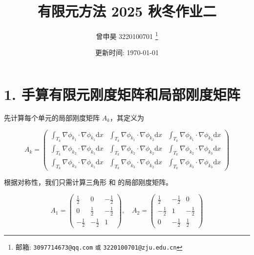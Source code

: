 \documentclass[a4paper]{article}
\begin{document}
\title{有限元方法 2025 秋冬作业二}

\author{曾申昊 3220100701
  \thanks{邮箱: \texttt{3097714673@qq.com}
                            \texttt{或} \texttt{3220100701@zju.edu.cn}}}


\date{更新时间: \today}

\maketitle


\section*{1. 手算有限元刚度矩阵和局部刚度矩阵}

先计算每个单元的局部刚度矩阵 $A_k$，其定义为

\begin{equation}
    A_k =
    \begin{pmatrix}
        \int_{T_k}\nabla \phi_{k_1} \cdot \nabla \phi_{k_1} \text{d}x &
        \int_{T_k}\nabla \phi_{k_1} \cdot \nabla \phi_{k_2} \text{d}x &
        \int_{T_k}\nabla \phi_{k_1} \cdot \nabla \phi_{k_3} \text{d}x\\
        \int_{T_k}\nabla \phi_{k_2} \cdot \nabla \phi_{k_1} \text{d}x &
        \int_{T_k}\nabla \phi_{k_2} \cdot \nabla \phi_{k_2} \text{d}x &
        \int_{T_k}\nabla \phi_{k_2} \cdot \nabla \phi_{k_3} \text{d}x\\
        \int_{T_k}\nabla \phi_{k_3} \cdot \nabla \phi_{k_1} \text{d}x &
        \int_{T_k}\nabla \phi_{k_3} \cdot \nabla \phi_{k_2} \text{d}x &
        \int_{T_k}\nabla \phi_{k_3} \cdot \nabla \phi_{k_3} \text{d}x
    \end{pmatrix}
    \label{局部刚度矩阵}
\end{equation}

根据对称性，我们只需计算三角形  和  的局部刚度矩阵。

\begin{equation}
    A_1 =
    \begin{pmatrix}
        \frac{1}{2} & 0 & -\frac{1}{2}\\
        0 & \frac{1}{2} & -\frac{1}{2}\\
        -\frac{1}{2} & -\frac{1}{2} & 1
    \end{pmatrix}, \quad
    A_2 =
    \begin{pmatrix}
        \frac{1}{2} & -\frac{1}{2} & 0\\
        -\frac{1}{2} & 1 & -\frac{1}{2}\\
        0 & -\frac{1}{2} & \frac{1}{2}
    \end{pmatrix}
\end{equation}
\end{document}
